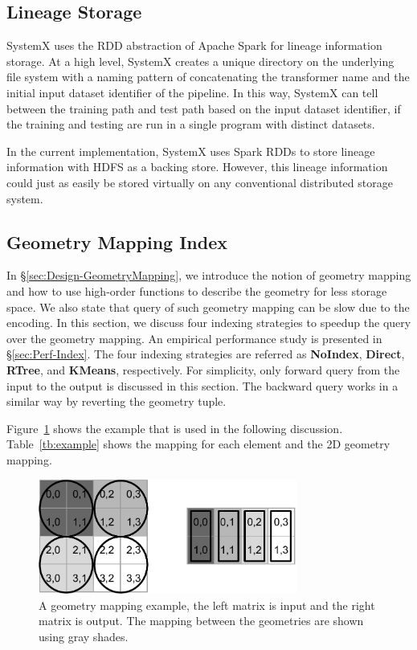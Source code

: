 \documentclass{sig-alternate}
\begin{document}
\subsection{Lineage Storage}
SystemX uses the RDD abstraction of Apache Spark for lineage information storage. 
At a high level, SystemX creates a unique directory on the underlying file system with a naming pattern of 
concatenating the transformer name and the initial input dataset identifier of the pipeline.
In this way, SystemX can tell between the training path and test path based on the input dataset identifier,
if the training and testing are run in a single program with distinct datasets.

In the current implementation, SystemX uses Spark RDDs to store lineage information with HDFS as a backing store. 
However, this lineage information could just as easily be stored virtually on any conventional distributed storage system.


\subsection{Geometry Mapping Index}
\label{sec:GeometryIndex}
In \S\ref{sec:Design-GeometryMapping}, we introduce the notion of geometry mapping and how to use high-order functions
to describe the geometry for less storage space. 
We also state that query of such geometry mapping can be slow due to the encoding. 
In this section, we discuss four indexing strategies to speedup the query over the geometry mapping. 
An empirical performance study is presented in \S\ref{sec:Perf-Index}.
The four indexing strategies are referred as {\bf NoIndex}, {\bf Direct}, {\bf RTree}, and {\bf KMeans}, respectively.
For simplicity, only forward query from the input to the output is discussed in this section.
The backward query works in a similar way by reverting the geometry tuple.


Figure~\ref{fig:example} shows the example that is used in the following discussion.
Table~\ref{tb:example} shows the mapping for each element and the 2D geometry mapping.
\begin{figure}[h]
\begin{center}
    \includegraphics[width=85mm]{pictures/example}
\caption {A geometry mapping example, the left matrix is input and the right matrix is output. The mapping between the geometries are shown using gray shades.
    \label{fig:example}
}
\end{center}
\end{figure}
\end{document}
